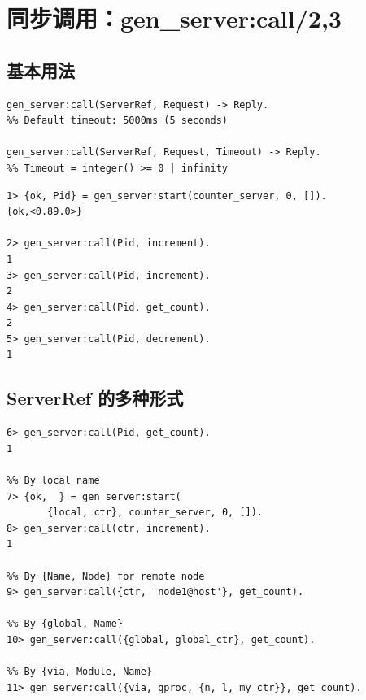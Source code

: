 \documentclass[a4paper,11pt]{article}
\begin{document}
\section{同步调用：gen\_server:call/2,3}

\subsection{基本用法}

\begin{lstlisting}[style=erlangstyle, caption={call 函数签名}]
gen_server:call(ServerRef, Request) -> Reply.
%% Default timeout: 5000ms (5 seconds)

gen_server:call(ServerRef, Request, Timeout) -> Reply.
%% Timeout = integer() >= 0 | infinity
\end{lstlisting}

\begin{lstlisting}[style=shellstyle, caption={call 基本交互}]
1> {ok, Pid} = gen_server:start(counter_server, 0, []).
{ok,<0.89.0>}

2> gen_server:call(Pid, increment).
1
3> gen_server:call(Pid, increment).
2
4> gen_server:call(Pid, get_count).
2
5> gen_server:call(Pid, decrement).
1
\end{lstlisting}

\subsection{ServerRef 的多种形式}

\begin{lstlisting}[style=shellstyle, caption={不同的 ServerRef 形式}]
%% By PID
6> gen_server:call(Pid, get_count).
1

%% By local name
7> {ok, _} = gen_server:start(
       {local, ctr}, counter_server, 0, []).
8> gen_server:call(ctr, increment).
1

%% By {Name, Node} for remote node
9> gen_server:call({ctr, 'node1@host'}, get_count).

%% By {global, Name}
10> gen_server:call({global, global_ctr}, get_count).

%% By {via, Module, Name}
11> gen_server:call({via, gproc, {n, l, my_ctr}}, get_count).
\end{lstlisting}
\end{document}
